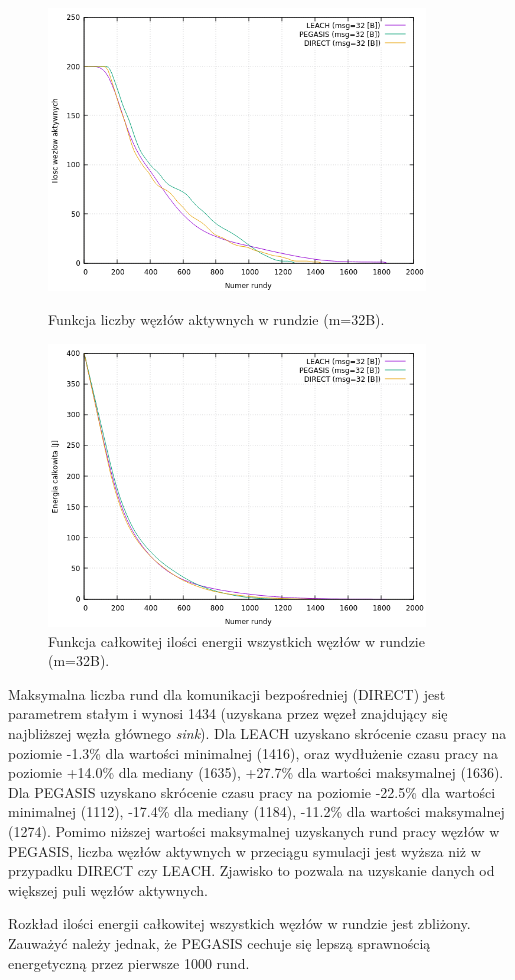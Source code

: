 \documentclass[a4paper,12pt,twoside,openany]{report}
\begin{document}
\begin{figure}[H]
 \centering
 \includegraphics[width=10cm]{images/gnuplot/test_1/nodes_in_round_m32.png}
 \caption{Funkcja liczby węzłów aktywnych w rundzie (m=32B).}
 \includegraphics[width=10cm]{images/gnuplot/test_1/energy_in_round_m32.png}
 \caption{Funkcja całkowitej ilości energii wszystkich węzłów w rundzie (m=32B).}
\end{figure}

\par
Maksymalna liczba rund dla komunikacji bezpośredniej (DIRECT) jest parametrem stałym i wynosi 1434 (uzyskana przez węzeł znajdujący się najbliższej węzła głównego \textit{sink}).
Dla LEACH uzyskano skrócenie czasu pracy na poziomie -1.3\% dla wartości minimalnej (1416), oraz wydłużenie czasu pracy na poziomie +14.0\% dla mediany (1635), +27.7\% dla wartości maksymalnej (1636).
Dla PEGASIS uzyskano skrócenie czasu pracy na poziomie -22.5\% dla wartości minimalnej (1112), -17.4\% dla mediany (1184), -11.2\% dla wartości maksymalnej (1274).
Pomimo niższej wartości maksymalnej uzyskanych rund pracy węzłów w PEGASIS, liczba węzłów aktywnych w przeciągu symulacji jest wyższa niż w przypadku DIRECT czy LEACH.
Zjawisko to pozwala na uzyskanie danych od większej puli węzłów aktywnych.
\par 
Rozkład ilości energii całkowitej wszystkich węzłów w rundzie jest zbliżony.
Zauważyć należy jednak, że PEGASIS cechuje się lepszą sprawnością energetyczną przez pierwsze 1000 rund.
\end{document}

